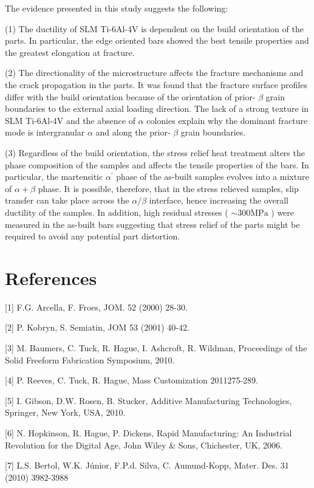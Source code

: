 \documentclass[10pt]{article}
\begin{document}
The evidence presented in this study suggests the following:

(1) The ductility of SLM Ti-6Al-4V is dependent on the build orientation of the parts. In particular, the edge oriented bars showed the best tensile properties and the greatest elongation at fracture.

(2) The directionality of the microstructure affects the fracture mechanisms and the crack propagation in the parts. It was found that the fracture surface profiles differ with the build orientation because of the orientation of prior- $\beta$ grain boundaries to the external axial loading direction. The lack of a strong texture in SLM Ti-6Al-4V and the absence of $\alpha$ colonies explain why the dominant fracture mode is intergranular $\alpha$ and along the prior- $\beta$ grain boundaries.

(3) Regardless of the build orientation, the stress relief heat treatment alters the phase composition of the samples and affects the tensile properties of the bars. In particular, the martensitic $\alpha^{\prime}$ phase of the as-built samples evolves into a mixture of $\alpha+\beta$ phase. It is possible, therefore, that in the stress relieved samples, slip transfer can take place across the $\alpha / \beta$ interface, hence increasing the overall ductility of the samples. In addition, high residual stresses ( $\sim 300 \mathrm{MPa}$ ) were measured in the as-built bars suggesting that stress relief of the parts might be required to avoid any potential part distortion.

\section*{References}
[1] F.G. Arcella, F. Froes, JOM. 52 (2000) 28-30.

[2] P. Kobryn, S. Semiatin, JOM 53 (2001) 40-42.

[3] M. Baumers, C. Tuck, R. Hague, I. Ashcroft, R. Wildman, Proceedings of the Solid Freeform Fabrication Symposium, 2010.

[4] P. Reeves, C. Tuck, R. Hague, Mass Customization 2011275-289.

[5] I. Gibson, D.W. Rosen, B. Stucker, Additive Manufacturing Technologies, Springer, New York, USA, 2010.

[6] N. Hopkinson, R. Hague, P. Dickens, Rapid Manufacturing: An Industrial Revolution for the Digital Age, John Wiley \& Sons, Chichester, UK, 2006.

[7] L.S. Bertol, W.K. Júnior, F.P.d. Silva, C. Aumund-Kopp, Mater. Des. 31 (2010) 3982-3988
\end{document}
